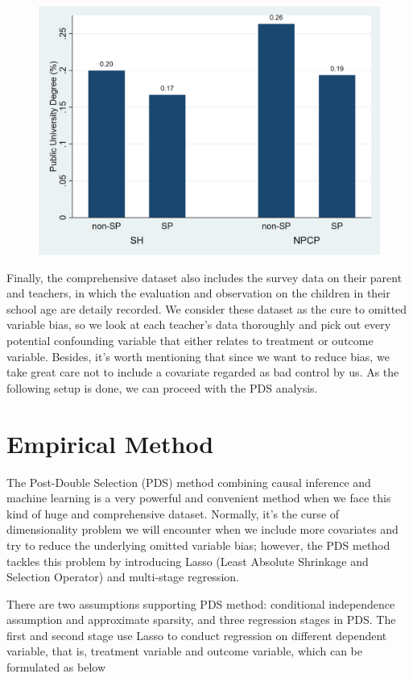 \documentclass[]{AEA}
\begin{document}
\begin{figure}
        \includegraphics[scale=0.13]{public_sp.png}
    \end{figure}

    Finally, the comprehensive dataset also includes the survey data on their parent and teachers, in which the evaluation and observation on the children in their school age are detaily recorded.  We consider these dataset as the cure to omitted variable bias, so we look at each teacher's data thoroughly and pick out every potential confounding variable that either relates to treatment or outcome variable.  Besides, it's worth mentioning that since we want to reduce bias, we take great care not to include a covariate regarded as bad control by us.  As the following setup is done, we can proceed with the PDS analysis.


\section{Empirical Method} %

    The Post-Double Selection (PDS) method combining causal inference and machine learning is a very powerful and convenient method when we face this kind of huge and comprehensive dataset.  Normally, it's the curse of dimensionality problem we will encounter when we include more covariates and try to reduce the underlying omitted variable bias; however, the PDS method tackles this problem by introducing Lasso (Least Absolute Shrinkage and Selection Operator) and multi-stage regression.

    There are two assumptions supporting PDS method: conditional independence assumption and approximate sparsity, and three regression stages in PDS.  The first and second stage use Lasso to conduct regression on different dependent variable, that is, treatment variable and outcome variable, which can be formulated as below
\end{document}
